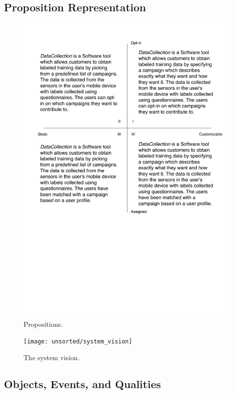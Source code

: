 \subsection{Proposition Representation}
\label{sub:proposition_representation}

\begin{figure}[!htbp]
	\centering
	\includegraphics[width=\textwidth]{graphic/problem_analysis/vision/propositions.pdf}
	\caption{Propositions.}
	\label{fig:propositions}
\end{figure}
\FloatBarrier

\begin{figure}[!htbp]
    \centering
    \texttt{[image: unsorted/system\_vision]}
    \caption{The system vision.}
    \label{fig:system_vision}
\end{figure}
\FloatBarrier

\subsection{Objects, Events, and Qualities}
\label{sub:objects_events_and_qualities}


